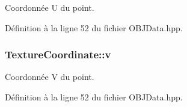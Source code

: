 Coordonnée U du point. 



Définition à la ligne 52 du fichier O\+B\+J\+Data.\+hpp.

\hypertarget{structTextureCoordinate_a894c1bf1a27da48a276e5fe7bba6e200}{
\subsubsection[{v}]{\setlength{\rightskip}{0pt plus 5cm}Texture\+Coordinate\+::v}}\label{structTextureCoordinate_a894c1bf1a27da48a276e5fe7bba6e200}


Coordonnée V du point. 



Définition à la ligne 52 du fichier O\+B\+J\+Data.\+hpp.

